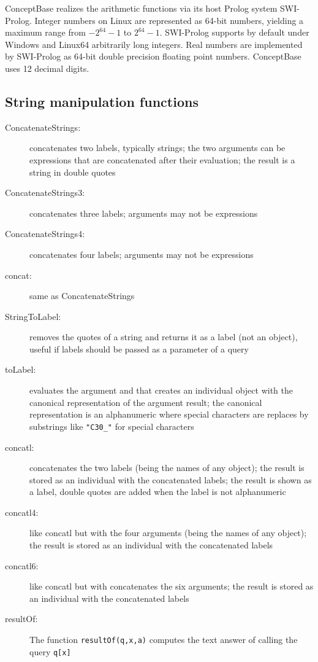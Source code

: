 ConceptBase realizes the arithmetic functions via its host Prolog system SWI-Prolog. 
Integer numbers on Linux are represented 
as 64-bit numbers, yielding a maximum range from $-2^{64}-1$
to $2^{64}-1$. SWI-Prolog supports by default under           
Windows and Linux64 arbitrarily long integers.
Real numbers are implemented by SWI-Prolog as 64-bit double precision
floating point numbers. ConceptBase uses 12 decimal digits.

\subsection{String manipulation functions}
\label{stringmanu}

\begin{description}
\item[ConcatenateStrings:] concatenates two labels, typically strings; the two arguments
  can be expressions that are concatenated after their evaluation; the result is a string
  in double quotes
\item[ConcatenateStrings3:] concatenates three labels; arguments may not be expressions
\item[ConcatenateStrings4:] concatenates four labels; arguments may not be expressions
\item[concat:] same as ConcatenateStrings
\item[StringToLabel:] removes the quotes of a string and returns it as a label (not
an object), useful if labels should be passed as a parameter of a query
\item[toLabel:] evaluates the argument and that creates an individual object with
  the canonical representation of the argument result; the canonical representation is
  an alphanumeric where special characters are replaces by substrings like {\tt "C30\_"}
  for special characters
\item[concatl:] concatenates the two labels (being the names of any object); the result is 
  stored as an individual with the concatenated labels; the result is shown as a label, double quotes are
  added when the label is not alphanumeric
\item[concatl4:] like concatl but with the four arguments (being the names of any object); the result is 
  stored as an individual with the concatenated labels
\item[concatl6:] like concatl but with concatenates the six arguments; the result is 
  stored as an individual with the concatenated labels
\item[resultOf:] The function {\tt resultOf(q,x,a)} computes the text answer of calling the query {\tt q[x]}

\end{description}
